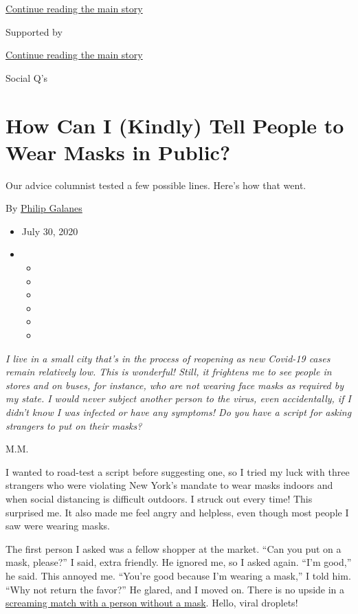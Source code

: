 \protect\hyperlink{after-top}{Continue reading the main story}

Supported by

\protect\hyperlink{after-sponsor}{Continue reading the main story}

Social Q's

\hypertarget{how-can-i-kindly-tell-people-to-wear-masks-in-public}{%
\section{How Can I (Kindly) Tell People to Wear Masks in
Public?}\label{how-can-i-kindly-tell-people-to-wear-masks-in-public}}

Our advice columnist tested a few possible lines. Here's how that went.

By \href{https://www.nytimes.com/by/philip-galanes}{Philip Galanes}

\begin{itemize}
\item
  July 30, 2020
\item
  \begin{itemize}
  \item
  \item
  \item
  \item
  \item
  \item
  \end{itemize}
\end{itemize}

\emph{I live in a small city that's in the process of reopening as new
Covid-19 cases remain relatively low. This is wonderful! Still, it
frightens me to see people in stores and on buses, for instance, who are
not wearing face masks as required by my state. I would never subject
another person to the virus, even accidentally, if I didn't know I was
infected or have any symptoms! Do you have a script for asking strangers
to put on their masks?}

M.M.

I wanted to road-test a script before suggesting one, so I tried my luck
with three strangers who were violating New York's mandate to wear masks
indoors and when social distancing is difficult outdoors. I struck out
every time! This surprised me. It also made me feel angry and helpless,
even though most people I saw were wearing masks.

The first person I asked was a fellow shopper at the market. ``Can you
put on a mask, please?'' I said, extra friendly. He ignored me, so I
asked again. ``I'm good,'' he said. This annoyed me. ``You're good
because I'm wearing a mask,'' I told him. ``Why not return the favor?''
He glared, and I moved on. There is no upside in a
\href{https://www.nytimes.com/2020/06/30/style/mask-america-freedom-coronavirus.html}{screaming
match with a person without a mask}. Hello, viral droplets!

